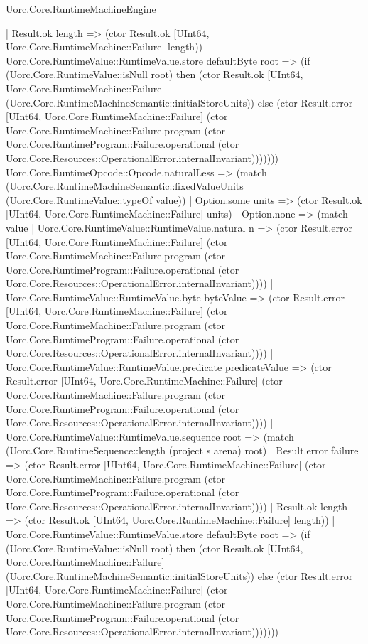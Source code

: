 \begin{lexlean}{Uorc.Core.RuntimeMachineEngine}
\begin{semanticmodule}
{                | Result.ok length => (ctor Result.ok [UInt64, Uorc.Core.RuntimeMachine::Failure] length))
              | Uorc.Core.RuntimeValue::RuntimeValue.store defaultByte root => (if (Uorc.Core.RuntimeValue::isNull root) then (ctor Result.ok [UInt64, Uorc.Core.RuntimeMachine::Failure] (Uorc.Core.RuntimeMachineSemantic::initialStoreUnits)) else (ctor Result.error [UInt64, Uorc.Core.RuntimeMachine::Failure] (ctor Uorc.Core.RuntimeMachine::Failure.program (ctor Uorc.Core.RuntimeProgram::Failure.operational (ctor Uorc.Core.Resources::OperationalError.internalInvariant)))))))
          | Uorc.Core.RuntimeOpcode::Opcode.naturalLess => (match (Uorc.Core.RuntimeMachineSemantic::fixedValueUnits (Uorc.Core.RuntimeValue::typeOf value))
            | Option.some units => (ctor Result.ok [UInt64, Uorc.Core.RuntimeMachine::Failure] units)
            | Option.none => (match value
              | Uorc.Core.RuntimeValue::RuntimeValue.natural n => (ctor Result.error [UInt64, Uorc.Core.RuntimeMachine::Failure] (ctor Uorc.Core.RuntimeMachine::Failure.program (ctor Uorc.Core.RuntimeProgram::Failure.operational (ctor Uorc.Core.Resources::OperationalError.internalInvariant))))
              | Uorc.Core.RuntimeValue::RuntimeValue.byte byteValue => (ctor Result.error [UInt64, Uorc.Core.RuntimeMachine::Failure] (ctor Uorc.Core.RuntimeMachine::Failure.program (ctor Uorc.Core.RuntimeProgram::Failure.operational (ctor Uorc.Core.Resources::OperationalError.internalInvariant))))
              | Uorc.Core.RuntimeValue::RuntimeValue.predicate predicateValue => (ctor Result.error [UInt64, Uorc.Core.RuntimeMachine::Failure] (ctor Uorc.Core.RuntimeMachine::Failure.program (ctor Uorc.Core.RuntimeProgram::Failure.operational (ctor Uorc.Core.Resources::OperationalError.internalInvariant))))
              | Uorc.Core.RuntimeValue::RuntimeValue.sequence root => (match (Uorc.Core.RuntimeSequence::length (project s arena) root)
                | Result.error failure => (ctor Result.error [UInt64, Uorc.Core.RuntimeMachine::Failure] (ctor Uorc.Core.RuntimeMachine::Failure.program (ctor Uorc.Core.RuntimeProgram::Failure.operational (ctor Uorc.Core.Resources::OperationalError.internalInvariant))))
                | Result.ok length => (ctor Result.ok [UInt64, Uorc.Core.RuntimeMachine::Failure] length))
              | Uorc.Core.RuntimeValue::RuntimeValue.store defaultByte root => (if (Uorc.Core.RuntimeValue::isNull root) then (ctor Result.ok [UInt64, Uorc.Core.RuntimeMachine::Failure] (Uorc.Core.RuntimeMachineSemantic::initialStoreUnits)) else (ctor Result.error [UInt64, Uorc.Core.RuntimeMachine::Failure] (ctor Uorc.Core.RuntimeMachine::Failure.program (ctor Uorc.Core.RuntimeProgram::Failure.operational (ctor Uorc.Core.Resources::OperationalError.internalInvariant)))))))
}
\end{semanticmodule}
\end{lexlean}
